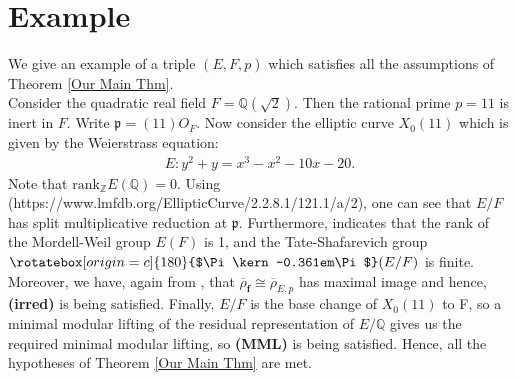 \documentclass[reqno,10pt]{amsart}
\newcommand{\q}{\mathbb{Q}}
\newcommand{\z}{\mathbb{Z}}
\newcommand{\f}{\mathbf{f}}
\newcommand{\p}{\mathfrak{p}}
\newcommand{\Varpi}{\rotatebox[origin=c]{180}{$\Pi\kern-0.361em\Pi$}}
\theoremstyle{plain}
\theoremstyle{definition}
\begin{document}
\section{Example}

   We give an example of a triple $(E,F,p)$ which satisfies all the assumptions of Theorem \ref{Our Main Thm}.
    \\
    Consider the quadratic real field $F = \q(\sqrt{2})$. Then the rational prime $p=11$ is inert in $F$. Write $\p = (11)O_F$. Now consider the elliptic curve $X_0(11)$ which is given by the Weierstrass equation:
    \begin{align*}
        E : y^2+y=x^3-x^2-10x-20.
    \end{align*}
    Note that $\mathrm{rank}_\z E(\q) = 0$. Using \cite{lmfdb} (https://www.lmfdb.org/EllipticCurve/2.2.8.1/121.1/a/2), one can see that $E/F$ has split multiplicative reduction at $\p$. Furthermore, \cite{lmfdb} indicates that the rank of the Mordell-Weil group  $E(F)$ is 1, and the Tate-Shafarevich group $\Varpi(E/F)$ is finite. Moreover, we have, again from \cite{lmfdb}, that $\overline{\rho}_\f \cong \overline{\rho}_{E,p}$ has maximal image and hence, \textbf{(irred)} is being satisfied. Finally, $E/F$ is the base change of $X_0(11)$ to F, so a minimal modular lifting of the residual representation of $E/\q$ gives us the required minimal modular lifting, so \textbf{(MML)} is being satisfied. Hence, all the hypotheses of Theorem \ref{Our Main Thm} are met. 
\end{document}
